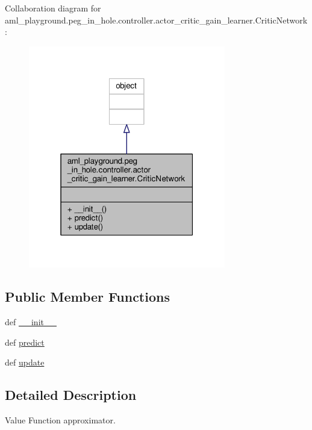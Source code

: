 Collaboration diagram for aml\-\_\-playground.\-peg\-\_\-in\-\_\-hole.\-controller.\-actor\-\_\-critic\-\_\-gain\-\_\-learner.\-Critic\-Network\-:\nopagebreak
\begin{figure}[H]
\begin{center}
\leavevmode
\includegraphics[width=244pt]{classaml__playground_1_1peg__in__hole_1_1controller_1_1actor__critic__gain__learner_1_1_critic_network__coll__graph}
\end{center}
\end{figure}
\subsection*{Public Member Functions}
\begin{DoxyCompactItemize}
\item 
def \hyperlink{classaml__playground_1_1peg__in__hole_1_1controller_1_1actor__critic__gain__learner_1_1_critic_network_a76303cb55e9b1f8136a03defd6d8fcec}{\-\_\-\-\_\-init\-\_\-\-\_\-}
\item 
def \hyperlink{classaml__playground_1_1peg__in__hole_1_1controller_1_1actor__critic__gain__learner_1_1_critic_network_a852ab237e2862271ef02f20afe3ffe9b}{predict}
\item 
def \hyperlink{classaml__playground_1_1peg__in__hole_1_1controller_1_1actor__critic__gain__learner_1_1_critic_network_a1e3f14374d6e308b33c01e75c2c4f38d}{update}
\end{DoxyCompactItemize}


\subsection{Detailed Description}
\begin{DoxyVerb}Value Function approximator. 
\end{DoxyVerb}
 

